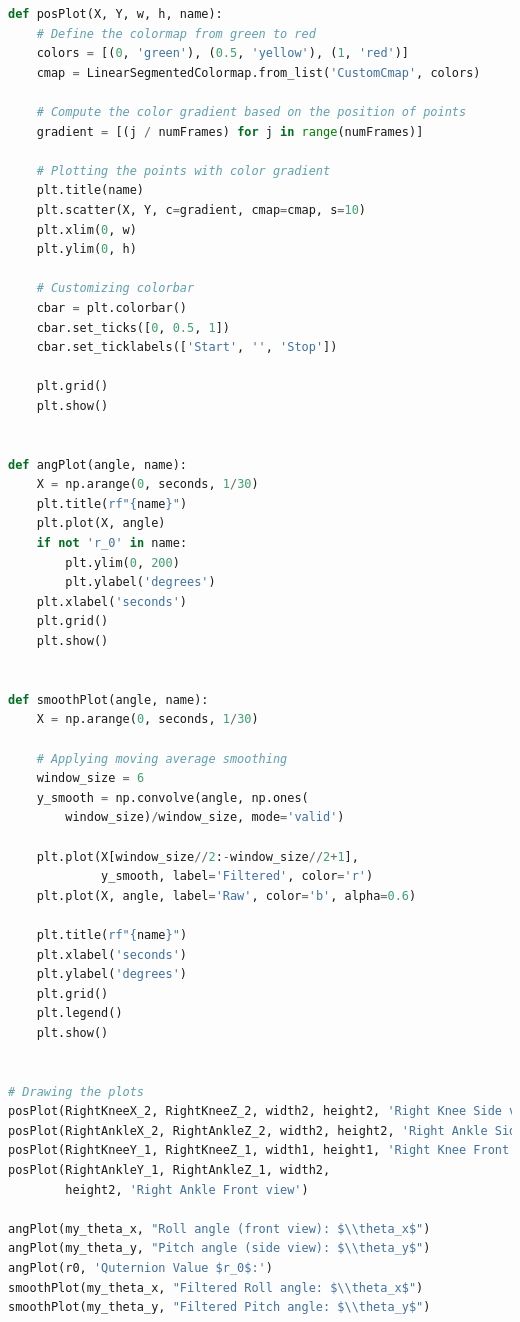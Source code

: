 \documentclass[conference]{IEEEtran}
\begin{document}
\begin{lstlisting}[language=Python]
def posPlot(X, Y, w, h, name):
    # Define the colormap from green to red
    colors = [(0, 'green'), (0.5, 'yellow'), (1, 'red')]
    cmap = LinearSegmentedColormap.from_list('CustomCmap', colors)

    # Compute the color gradient based on the position of points
    gradient = [(j / numFrames) for j in range(numFrames)]

    # Plotting the points with color gradient
    plt.title(name)
    plt.scatter(X, Y, c=gradient, cmap=cmap, s=10)
    plt.xlim(0, w)
    plt.ylim(0, h)

    # Customizing colorbar
    cbar = plt.colorbar()
    cbar.set_ticks([0, 0.5, 1])
    cbar.set_ticklabels(['Start', '', 'Stop'])

    plt.grid()
    plt.show()


def angPlot(angle, name):
    X = np.arange(0, seconds, 1/30)
    plt.title(rf"{name}")
    plt.plot(X, angle)
    if not 'r_0' in name:
        plt.ylim(0, 200)
        plt.ylabel('degrees')
    plt.xlabel('seconds')
    plt.grid()
    plt.show()


def smoothPlot(angle, name):
    X = np.arange(0, seconds, 1/30)

    # Applying moving average smoothing
    window_size = 6
    y_smooth = np.convolve(angle, np.ones(
        window_size)/window_size, mode='valid')

    plt.plot(X[window_size//2:-window_size//2+1],
             y_smooth, label='Filtered', color='r')
    plt.plot(X, angle, label='Raw', color='b', alpha=0.6)

    plt.title(rf"{name}")
    plt.xlabel('seconds')
    plt.ylabel('degrees')
    plt.grid()
    plt.legend()
    plt.show()


# Drawing the plots
posPlot(RightKneeX_2, RightKneeZ_2, width2, height2, 'Right Knee Side view')
posPlot(RightAnkleX_2, RightAnkleZ_2, width2, height2, 'Right Ankle Side view')
posPlot(RightKneeY_1, RightKneeZ_1, width1, height1, 'Right Knee Front view')
posPlot(RightAnkleY_1, RightAnkleZ_1, width2,
        height2, 'Right Ankle Front view')

angPlot(my_theta_x, "Roll angle (front view): $\\theta_x$")
angPlot(my_theta_y, "Pitch angle (side view): $\\theta_y$")
angPlot(r0, 'Quternion Value $r_0$:')
smoothPlot(my_theta_x, "Filtered Roll angle: $\\theta_x$")
smoothPlot(my_theta_y, "Filtered Pitch angle: $\\theta_y$")

\end{lstlisting}

\end{document}
